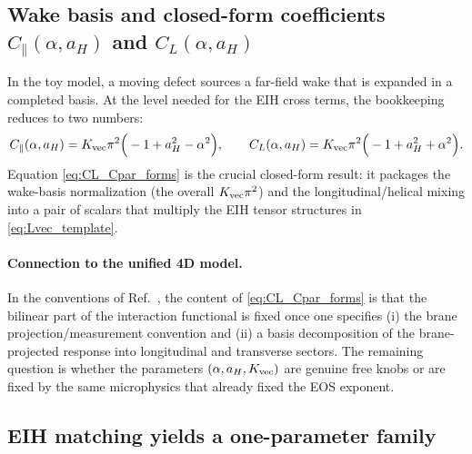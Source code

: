 \documentclass[11pt]{article}
\begin{document}
\subsection{Wake basis and closed-form coefficients \texorpdfstring{$C_\parallel(\alpha,a_H)$}{C||(alpha,aH)} and \texorpdfstring{$C_L(\alpha,a_H)$}{CL(alpha,aH)}}
\label{sec:1pn-interaction-coeffs}

In the toy model, a moving defect sources a far-field wake that is expanded in a completed basis.
At the level needed for the EIH cross terms, the bookkeeping reduces to two numbers:
\begin{equation}
  C_\parallel(\alpha,a_H)=K_{\rm vec}\pi^2\Big(-1+a_H^2-\alpha^2\Big),
  \qquad
  C_L(\alpha,a_H)=K_{\rm vec}\pi^2\Big(-1+a_H^2+\alpha^2\Big).
  \label{eq:CL_Cpar_forms}
\end{equation}
Equation \eqref{eq:CL_Cpar_forms} is the crucial closed-form result: it packages the wake-basis
normalization (the overall $K_{\rm vec}\pi^2$) and the longitudinal/helical mixing into a pair of scalars
that multiply the EIH tensor structures in \eqref{eq:Lvec_template}.

\paragraph{Connection to the unified 4D model.}
In the conventions of Ref.~\cite{norris2026_4d_model}, the content of \eqref{eq:CL_Cpar_forms} is that the bilinear part of the
interaction functional is fixed once one specifies (i) the brane projection/measurement convention
and (ii) a basis decomposition of the brane-projected response into longitudinal and transverse sectors.
The remaining question is whether the parameters $(\alpha,a_H,K_{\rm vec})$ are genuine free knobs or are fixed by
the same microphysics that already fixed the EOS exponent.

\subsection{EIH matching yields a one-parameter family}
\label{sec:1pn-interaction-family}
\end{document}
